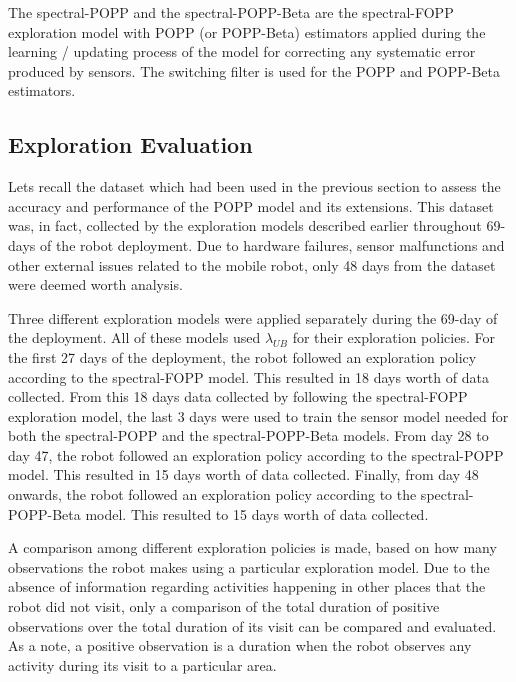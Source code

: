 The spectral-POPP and the spectral-POPP-Beta are the spectral-FOPP exploration model with POPP (or POPP-Beta) estimators applied during the learning / updating process of the model for correcting any systematic error produced by sensors. The switching filter is used for the POPP and POPP-Beta estimators.

\subsection*{Exploration Evaluation}

Lets recall the dataset which had been used in the previous section to assess the accuracy and performance of the POPP model and its extensions. This dataset was, in fact, collected by the exploration models described earlier throughout 69-days of the robot deployment. Due to hardware failures, sensor malfunctions and other external issues related to the mobile robot, only 48 days from the dataset were deemed worth analysis.

Three different exploration models were applied separately during the 69-day of
the deployment. All of these models used $\lambda_{UB}$ for their exploration policies. For the first 27 days of the deployment, the robot followed an exploration policy according to the spectral-FOPP model. This resulted in 18 days worth of data collected. From this 18 days data collected by following the spectral-FOPP exploration model, the last 3 days were used to train the sensor model needed for both the spectral-POPP and the spectral-POPP-Beta models. From day 28 to day 47, the robot followed an exploration policy according to the spectral-POPP model. This resulted in 15 days worth of data collected. Finally, from day 48 onwards, the robot followed an exploration policy according to the spectral-POPP-Beta model. This resulted to 15 days worth of data collected.


A comparison among different exploration policies is made, based on how many observations the robot makes using a particular exploration model. Due to the absence of information regarding activities happening in other places that the robot did not visit, only a comparison of the total duration of positive observations over the total duration of its visit can be compared and evaluated. As a note, a positive observation is a duration when the robot observes any activity during its visit to a particular area. 

